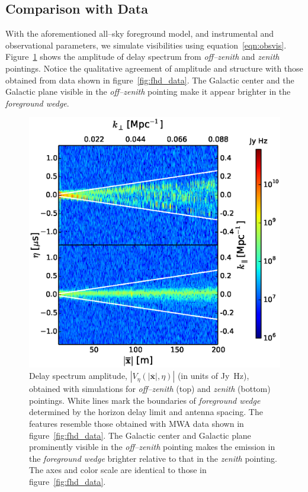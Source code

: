 \documentclass[preprint2,iop,numberedappendix]{emulateapj}
\begin{document}
\subsection{Comparison with Data}\label{sec:data-vs-model}

With the aforementioned all--sky foreground model, and instrumental and observational parameters, we simulate visibilities using equation~\ref{eqn:obsvis}. Figure~\ref{fig:sim_data} shows the amplitude of delay spectrum from {\it off--zenith} and {\it zenith} pointings. Notice the qualitative agreement of amplitude and structure with those obtained from data shown in figure~\ref{fig:fhd_data}. The Galactic center and the Galactic plane visible in the {\it off--zenith} pointing make it appear brighter in the {\it foreground wedge}. 

\begin{figure}[htb]
\centering
\includegraphics[width=\linewidth]{figures/v1_0/multi_baseline_sim_delay_spectrum_snapshots.eps}
\caption{Delay spectrum amplitude, $|V_\eta(|\overline{\mathbf{x}}|,\eta)|$ (in units of Jy~Hz), obtained with simulations for {\it off--zenith} (top) and {\it zenith} (bottom) pointings. White lines mark the boundaries of {\it foreground wedge} determined by the horizon delay limit and antenna spacing. The features resemble those obtained with MWA data shown in figure~\ref{fig:fhd_data}. The Galactic center and Galactic plane prominently visible in the {\it off--zenith} pointing makes the emission in the {\it foreground wedge} brighter relative to that in the {\it zenith} pointing. The axes and color scale are identical to those in figure~\ref{fig:fhd_data}. \label{fig:sim_data}}
\end{figure}
\end{document}
